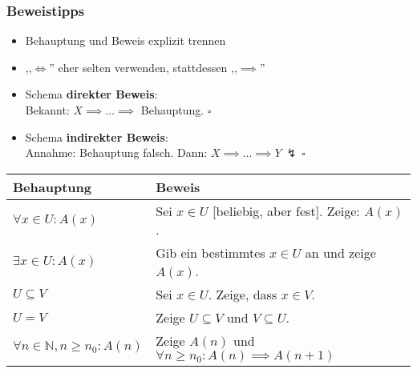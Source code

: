 \renewcommand{\arraystretch}{1.0}
\begin{frame}
  \frametitle{Beweistipps}
  \begin{itemize}
  \item Behauptung und Beweis explizit trennen
  \item ,,$\iff$'' eher selten verwenden, stattdessen ,,$\implies$''
  \item Schema \textbf{direkter Beweis}: \\
        Bekannt: $X \implies \ldots \implies$ Behauptung. $\square$
  \item Schema \textbf{indirekter Beweis}: \\
        Annahme: Behauptung falsch.
        Dann: $X \implies \ldots \implies Y \ \lightning \ \square$
  \end{itemize}

  \begin{center}
  \begin{tabular}{| l || l |} \hline
  \textbf{Behauptung} & \textbf{Beweis} \\ \hline
    $\forall x \in U: A(x)$
      & Sei $x \in U$ [beliebig, aber fest]. Zeige: $A(x)$.
      \\ \hline
    $\exists x \in U: A(x)$
      & Gib ein bestimmtes $x \in U$ an und zeige $A(x)$.
      \\ \hline
    $U \subseteq V$
      & Sei $x \in U$. Zeige, dass $x \in V$.
      \\ \hline
    $U = V$
      & Zeige $U \subseteq V$ und $V \subseteq U$.
      \\ \hline
    $\forall n \in \mathbb{N}, n \geq n_0: A(n)$
      & Zeige $A(n)$ und $\forall n \geq n_0: A(n) \implies A(n+1)$
      \\ \hline
  \end{tabular}
  \end{center}
\end{frame}


